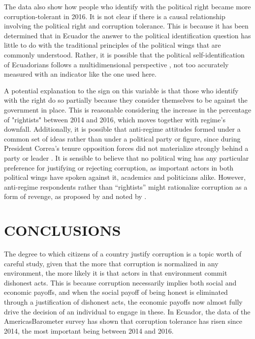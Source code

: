 \documentclass[12pt,a4]{article}\usepackage[]{graphicx}\usepackage[]{xcolor}
\begin{document}
The data also show how people who identify with the political right became more corruption-tolerant in 2016. It is not clear if there is a causal relationship involving the political right and corruption tolerance. This is because it has been determined that in Ecuador the answer to the political identification question has little to do with the traditional principles of the political wings that are commonly understood. Rather, it is possible that the political self-identification of Ecuadorians follows a multidimensional perspective \parencite{Moncagatta.2020b}, not too accurately measured with an indicator like the one used here. 

A potential explanation to the sign on this variable is that those who identify with the right do so partially because they consider themselves to be against the government in place. This is reasonable considering the increase in the percentage of "rightists" between 2014 and 2016, which moves together with regime's downfall. Additionally, it is possible that anti-regime attitudes formed under a common set of ideas rather than under a political party or figure, since during President Correa's tenure opposition forces did not materialize strongly behind a party or leader \parencite{Melendez.2017}. It is sensible to believe that no political wing has any particular preference for justifying or rejecting corruption, as important actors in both political wings have spoken against it, academics \parencite{Holcombe.2015} and politicians \parencite{Morris.2021} alike. However, anti-regime respondents rather than \enquote{rightists} might rationalize corruption as a form of revenge, as proposed by \textcite{Ashforth.2003} and noted by \textcite{Adoum.2000}.










\section{CONCLUSIONS}

The degree to which citizens of a country justify corruption is a topic worth of careful study, given that the more that corruption is normalized in any environment, the more likely it is that actors in that environment commit dishonest acts. This is because corruption necessarily implies both social and economic payoffs, and when the social payoff of being honest is eliminated through a justification of dishonest acts, the economic payoffs now almost fully drive the decision of an individual to engage in these. In Ecuador, the data of the AmericasBarometer survey has shown that corruption tolerance has risen since 2014, the most important being between 2014 and 2016.
\end{document}
